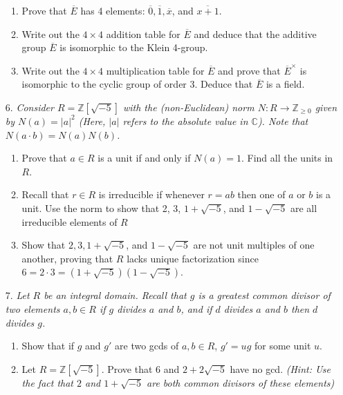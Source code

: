 \documentclass[12pt]{article}
\newcommand{\Z}{\mathbb{Z}}
\newcommand{\C}{\mathbb{C}}
\newcommand{\ba}{\overline}
\begin{document}
\begin{enumerate}
\begin{enumerate}
    \item Prove that $\ba{E}$ has 4 elements: $\ba{0}, \ba{1}, \ba{x}$, and $\ba{x+1}$.
    
    \item Write out the $4\times 4$ addition table for $\ba{E}$ and deduce that the additive group $\ba{E}$ is isomorphic to the Klein 4-group.

    \item Write out the $4\times 4$ multiplication table for $\ba{E}$ and prove that $\ba{E}^\times$ is isomorphic to the cyclic group of order 3. Deduce that $\ba{E}$ is a field.
\end{enumerate}

\item[6.] \textit{Consider $R = \Z[\sqrt{-5}]$ with the (non-Euclidean) norm $N:R\to \Z_{\ge 0}$ given by $N(a) = |a|^2$ (Here, $|a|$ refers to the absolute value in $\C$). Note that $N(a\cdot b) = N(a)N(b)$.}

\begin{enumerate}
    \item Prove that $a\in R$ is a unit if and only if $N(a) = 1$. Find all the units in $R$.
    
    \item Recall that $r\in R$ is irreducible if whenever $r = ab$ then one of $a$ or $b$ is a unit. Use the norm to show that 2, 3, $1+\sqrt{-5}$, and $1-\sqrt{-5}$ are all irreducible elements of $R$
    
    \item Show that $2, 3, 1 + \sqrt{-5}$, and $1 - \sqrt{-5}$ are not unit multiples of one another, proving that $R$ lacks unique factorization since $6 = 2\cdot 3 = (1+\sqrt{-5})(1-\sqrt{-5})$.
\end{enumerate}

 
\item[7.] \textit{Let $R$ be an integral domain. Recall that $g$ is a greatest common divisor of two elements $a, b\in R$
if $g$ divides $a$ and $b$, and if $d$ divides $a$ and $b$ then $d$ divides $g$.}

\begin{enumerate}
    \item Show that if $g$ and $g'$ are two gcds of $a,b\in R$, $g' = ug$ for some unit $u$.
    
    \item Let $R = \Z[\sqrt{-5}]$. Prove that $6$ and $2+2\sqrt{-5}$ have no gcd. \emph{(Hint: Use the fact that $2$ and $1+\sqrt{-5}$ are both common divisors of these elements)}
\end{enumerate}

\end{enumerate}
\end{document}
